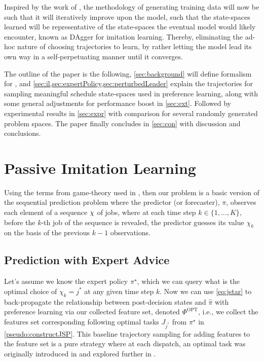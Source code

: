 Inspired by the work of \cite{RossB10,RossGB11}, the methodology of generating 
training data will now be such that it will iteratively improve upon the model, 
such that the state-spaces learned will be representative of the state-spaces 
the eventual model would likely encounter, known as DAgger for imitation 
learning.
Thereby, eliminating the ad-hoc nature of choosing trajectories to learn, by 
rather letting the model lead its own way in a self-perpetuating manner until 
it converges.

The outline of the paper is the following, \cref{sec:background} will define 
formalism for \JSP, and \cref{sec:il,sec:expertPolicy,sec:perturbedLeader} 
explain the trajectories for sampling meaningful schedule state-spaces used in 
preference learning, 
along with some general adjustments for performance boost in \cref{sec:ext}.
Followed by experimental results in \cref{sec:expr} with comparison for several 
randomly generated problem spaces. 
The paper finally concludes in \cref{sec:con} with discussion and conclusions.

\section{Passive Imitation Learning}\label{sec:il:passive}
Using the terms from game-theory used in \cite{CesaBianchi06}, %
then our problem is a basic version of the sequential prediction problem where 
the predictor (or forecaster), $\pi$, observes each element of a sequence 
${\mathbf{\chi}}$ of jobs, where at each time step $k \in \{1,...,K\}$, before the 
$k$-th job of the sequence is revealed, the predictor guesses its value 
$\chi_k$ on the basis of the previous $k-1$ observations. 

\subsection{Prediction with Expert Advice}\label{sec:expertPolicy}
Let's assume we know the expert policy $\pi^\star$, which we can query what 
is the optimal choice of $\chi_k={j^*}$ at any given time step $k$. 
Now we can use \cref{eq:jstar} to back-propagate the relationship between 
post-decision states and $\hat{\pi}$ with preference learning via our collected 
feature set, denoted $\Phi^\text{OPT}$, i.e., we collect the features set 
corresponding following optimal tasks $J_{j^*}$ from $\pi^\star$ in 
\cref{pseudo:constructJSP}.
This baseline trajectory sampling for adding features to the feature set 
is a pure strategy where at each dispatch, an optimal task was originally 
introduced in \cite{InRu11a} and explored further in \cite{InRu15b}. 

